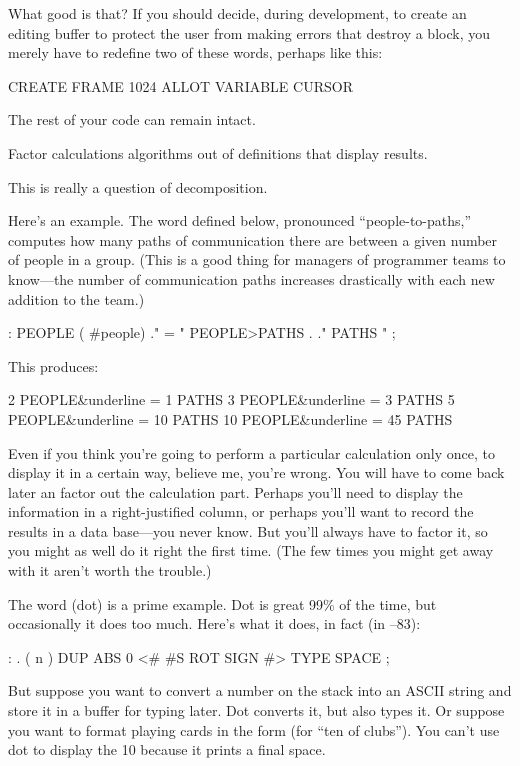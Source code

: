 What good is that? If you should decide, during development, to create
an editing buffer to protect the user from making errors that destroy
a block, you merely have to redefine two of these words, perhaps like
this:

\begin{Code}
CREATE FRAME  1024 ALLOT
VARIABLE CURSOR
\end{Code}
The rest of your code can remain intact. 

\begin{tip}
Factor calculations algorithms out of definitions that display results.
\end{tip}
This is really a question of decomposition.

Here's an example. The word defined below, pronounced
``people-to-paths,'' computes how many paths of communication there are
between a given number of people in a group. (This is a good thing for
managers of programmer teams to know---the number of communication
paths increases drastically with each new addition to the team.)

\begin{Code}
: PEOPLE  ( #people)
    ." = "  PEOPLE>PATHS  .  ." PATHS " ;
\end{Code}
This produces:

\begin{Code}[commandchars=\&\{\}]
2 PEOPLE&underline{ = 1 PATHS}
3 PEOPLE&underline{ = 3 PATHS}
5 PEOPLE&underline{ = 10 PATHS}
10 PEOPLE&underline{ = 45 PATHS}
\end{Code}
Even if you think you're going to perform a particular calculation
only once, to display it in a certain way, believe me, you're wrong.
You will have to come back later an factor out the calculation part.
Perhaps you'll need to display the information in a right-justified
column, or perhaps you'll want to record the results in a data
base---you never know. But you'll always have to factor it, so you
might as well do it right the first time. (The few times you might get
away with it aren't worth the trouble.)

The word  (dot) is a prime example. Dot is great 99\% of the
time, but occasionally it does too much. Here's what it does, in fact
(in \Forth{}--83):

\begin{Code}
: .   ( n )  DUP ABS 0 <# #S  ROT SIGN  #> TYPE SPACE ;
\end{Code}
But suppose you want to convert a number on the stack into an ASCII
string and store it in a buffer for typing later. Dot converts it, but
also types it. Or suppose you want to format playing cards in the form
 (for ``ten of clubs''). You can't use dot to display the 10
because it prints a final space.

